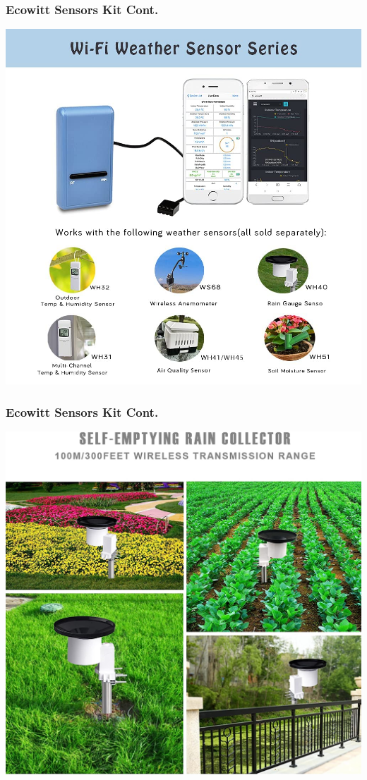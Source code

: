 \documentclass{beamer}
\begin{document}
\begin{frame}
  \frametitle{Ecowitt Sensors Kit Cont.}
  \includegraphics[scale=0.2]{sensors-collection.jpg}
\end{frame}

\begin{frame}
  \frametitle{Ecowitt Sensors Kit Cont.}
  \includegraphics[scale=0.15]{rain-gaunt.jpg}
\end{frame}
\end{document}
